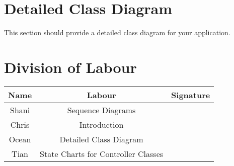 \documentclass[]{article}
\begin{document}
\section{Detailed Class Diagram}
\label{sec:detailed_class_diagram}
This section should provide a detailed class diagram for your application.

\vfill
\listoffigures

\appendix
\section{Division of Labour}
\label{sec:division_of_labour}
\begin{center}
\begin{tabular}{ |c|c|c| }
 \hline
 Name & Labour & Signature \\ \hline
 Shani & Sequence Diagrams & \\
 Chris & Introduction  &  \\
 Ocean &  Detailed Class Diagram &  \\
 Tian & State Charts for Controller Classes & \\
 \hline
\end{tabular}
\end{center}
\end{document}
